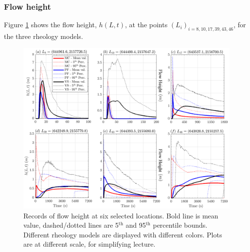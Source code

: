 \documentclass{article}
\begin{document}
\subsubsection{Flow height}
Figure \ref{fig:Colima-H} shows the flow height, $h(L,t)$, at the points $(L_i)_{i=8,10,17,39,43,46}$, for the three rheology models. 
\begin{figure}[H]
         \centering
        \includegraphics[width=1\textwidth]{BAF_VolcanDeColima/LocalMeasurments/Height.png}
        \caption{Records of flow height at six selected locations. Bold line is mean value, dashed/dotted lines are 5$^{\mathrm{th}}$ and 95$^{\mathrm{th}}$ percentile bounds. Different rheology models are displayed with different colors. Plots are at different scale, for simplifying lecture.}
        \label{fig:Colima-H}
\end{figure}
\end{document}
